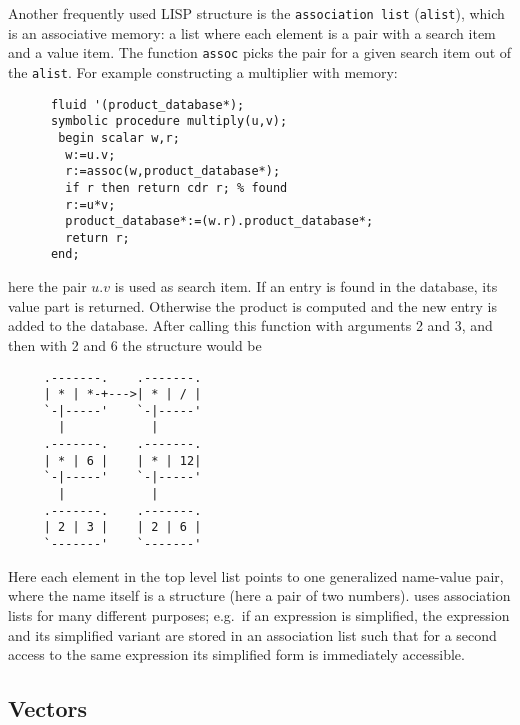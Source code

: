 Another frequently used LISP structure is the 
{\tt association list} 
({\tt alist}), which is
an associative memory: a list where each element
is a pair with a search item and a value item.
The function {\tt assoc} picks the pair for
a given search item out of the {\tt alist}.
For example constructing a multiplier with memory:
{\nopagebreak[3]
\begin{verbatim}
      fluid '(product_database*);
      symbolic procedure multiply(u,v);
       begin scalar w,r;
        w:=u.v;
        r:=assoc(w,product_database*);
        if r then return cdr r; % found
        r:=u*v;
        product_database*:=(w.r).product_database*;
        return r;
      end;
\end{verbatim}
}
here the pair $u.v$ is used as search item. If an
entry is found in the database, its value part is
returned. Otherwise  the product is computed and
the new entry is added to the database. After calling
this function with arguments 2 and 3, and then with 2 and 6 the
structure would be
{\nopagebreak[3]
\begin{verbatim}
     .-------.    .-------.
     | * | *-+--->| * | / |
     `-|-----'    `-|-----'
       |            |
     .-------.    .-------.
     | * | 6 |    | * | 12|
     `-|-----'    `-|-----'
       |            |
     .-------.    .-------.
     | 2 | 3 |    | 2 | 6 |
     `-------'    `-------'
\end{verbatim} 
}
Here each element in the top level list points to one 
generalized name-value pair, where the name itself is a structure
(here a pair of two numbers). {\reduce} uses association lists
for many different purposes; e.g.\ if an expression is simplified, 
the expression and its simplified variant are stored in an 
association list such that for a second access to the same expression 
its simplified form is immediately accessible.


\subsection{Vectors}

